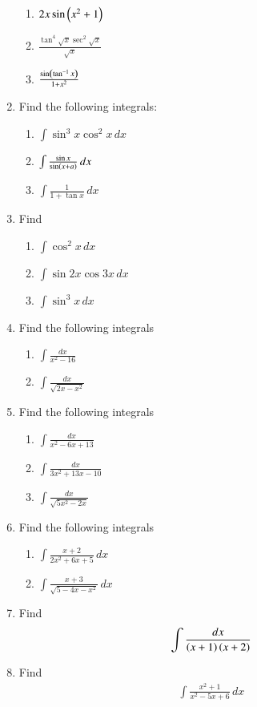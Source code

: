 \begin{enumerate}[label=\arabic*.,ref=\thesubsection.\theenumi]
\begin{enumerate}
\item  $2x\sin \left(x^2+1\right)$
\item  $\frac{\tan^4 \sqrt{x} \sec^2\sqrt{x}}{\sqrt{x}}$
\item  $\frac{\sin \left(\tan ^{-1}x\right)}{1+x^2}$
%
\end{enumerate}
%
\item Find the following integrals:
\begin{enumerate}
%
\item  $\int \sin^3 x \cos ^2 x \, dx$
\item  $\int \frac{\sin x}{\sin \left(x+a\right)} \, dx$
\item  $\int \frac{1}{1+\tan x}  \, dx$
%
\end{enumerate}
%
\item Find 
\begin{enumerate}
%
\item  $\int \cos ^2 x \, dx$
\item  $\int \sin 2x \cos 3x\, dx$
\item  $\int \sin^3 x \, dx$
%
\end{enumerate}
%
\item Find the following integrals
\begin{enumerate}
%
\item  $\int \frac{dx}{x^2-16}$
\item  $\int \frac{dx}{\sqrt{2x-x^2}}$
%
\end{enumerate}
%
\item Find the following integrals
\begin{enumerate}
%
\item  $\int \frac{dx}{x^2-6x + 13}$
\item  $\int \frac{dx}{3x^2 + 13x -10}$
\item  $\int \frac{dx}{\sqrt{5x^2-2x}}$
%
\end{enumerate}
%
\item Find the following integrals
\begin{enumerate}
%
\item  $\int \frac{x+2}{2x^2+6x + 5}\,dx$
\item  $\int \frac{x+3}{\sqrt{5-4x-x^2}}\,dx$
%
\end{enumerate}
\item Find 
\begin{align}
\int \frac{dx}{\left(x+1\right)\left(x+2\right)}
\end{align}
\item Find 
\begin{align}
\int \frac{x^2+1}{x^2-5x+6}\,dx

\end{align}
\end{enumerate}
